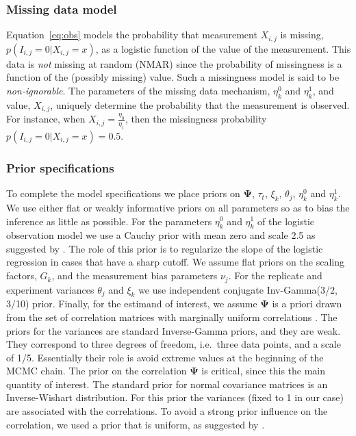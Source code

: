 \documentclass[10pt]{article}
\newcommand{\mat}[1]{\boldsymbol{\mathbf{#1}}}
\begin{document}
\subsubsection*{Missing data model}

Equation~\ref{eq:obs} models the probability that measurement
$X_{i,j}$ is missing, $p(I_{i,j} = 0 |X_{i,j}=x)$, as a logistic function of the
value of the measurement.  This data is \emph{not} missing at random
(NMAR) since the probability of missingness is a function of the
(possibly missing) value.  Such a missingness model is said to be
\emph{non-ignorable}.  The parameters of the missing data mechanism,
$\eta^0_{k}$ and $\eta^1_{k}$, and value, $X_{i,j}$, uniquely determine the
probability that the measurement is observed.  For instance, when
$X_{i,j} = \frac{\eta_0}{\eta_1}$, then the missingness probability $p(I_{i,j} = 0 |X_{i,j}=x) = 0.5$.


\subsubsection*{Prior specifications}

To complete the model specifications we place priors on $\mat\Psi$,
$\tau_{t}$, $\xi_{k}$, $\theta_{j}$, $\eta^0_k$ and $\eta^1_k$. We use
either flat or weakly informative priors on all parameters so as to
bias the inference as little as possible.  For the parameters
$\eta^0_k$ and $\eta^1_k$ of the logistic observation model we use a
Cauchy prior with mean zero and scale 2.5 as suggested by
\cite{gelman08}.  The role of this prior is to regularize the slope of
  the logistic regression in cases that have a sharp cutoff.
  We assume flat priors on the scaling factors,
$G_k$, and the measurement bias parameters $\nu_j$. For the replicate
and experiment variances $\theta_j$ and $\xi_k$ we use independent
conjugate Inv-Gamma(3/2, 3/10) prior.  Finally, for the estimand of
interest, we assume $\mat \Psi$ is a priori drawn from the set of
correlation matrices with marginally uniform correlations
\cite{barnard00}. 
The priors for the variances are standard Inverse-Gamma priors, and
  they are weak. They correspond to three degrees of freedom,
  i.e.~three data points, and a scale of 1/5. Essentially their role is
  avoid extreme values at the beginning of the MCMC chain.
The prior on the correlation $\mat \Psi$ is critical, since this the
  main quantity of interest. The standard prior for normal covariance
  matrices is an Inverse-Wishart distribution. For this prior the variances (fixed to
  1 in our case) are associated with the correlations. To avoid a strong
  prior influence on the correlation, we used a prior that is uniform, as
  suggested by \cite{barnard00}.
\end{document}
